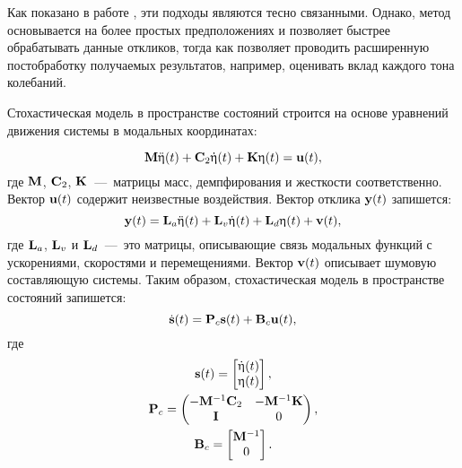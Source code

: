 Как показано в работе \cite{lib:oma:Peeters}, эти подходы являются тесно связанными. Однако, метод  основывается на более простых предположениях и позволяет быстрее обрабатывать данные откликов, тогда как  позволяет проводить расширенную постобработку получаемых результатов, например, оценивать вклад каждого тона колебаний.

Стохастическая модель в пространстве состояний строится на основе уравнений движения системы в модальных координатах:

\begin{equation}
	\mathbf{M} \ddot{\mathbf{\upeta}}(t) + \mathbf{C}_2 \dot{\mathbf{\upeta}}(t) + \mathbf{K} \upeta(t) = \mathbf{u}(t),
\end{equation}
где $ \mathbf{M} $, $ \mathbf{C}_2 $, $ \mathbf{K} $~---~матрицы масс, демпфирования и жесткости соответственно. Вектор $ \mathbf{u}(t) $ содержит неизвестные воздействия. Вектор отклика $ \mathbf{y}(t) $ запишется:
\begin{equation}
	\mathbf{y}(t) = \mathbf{L}_a \ddot{\mathbf{\upeta}}(t) + \mathbf{L}_v \dot{\mathbf{\upeta}}(t) + \mathbf{L}_d \upeta(t) + \mathbf{v}(t),
\end{equation}
где $ \mathbf{L}_a $, $ \mathbf{L}_v $ и $ \mathbf{L}_d $~---~это матрицы, описывающие связь модальных функций с ускорениями, скоростями и перемещениями. Вектор $ \mathbf{v}(t) $ описывает шумовую составляющую системы. Таким образом, стохастическая модель в пространстве состояний запишется:
\begin{equation}
	\dot{\mathbf{s}}(t) = \mathbf{P}_c \mathbf{s}(t) + \mathbf{B}_c \mathbf{u}(t), \label{eq:stochasticModelSSI}
\end{equation}
где 
\begin{gather}
	\mathbf{s}(t) = 
	\begin{bmatrix} 
		\dot{\mathbf{\upeta}}(t) \\ 
		\mathbf{\upeta}(t) 
	\end{bmatrix}, \\
	\mathbf{P}_c =
	\begin{pmatrix}
		-\mathbf{M} ^ {-1} \mathbf{C}_2 & -\mathbf{M} ^ {-1} \mathbf{K} \\
		 \mathbf{I} & 0
	\end{pmatrix}, \\
	\mathbf{B}_c = 
	\begin{bmatrix}
		\mathbf{M} ^ {-1} \\
		0	
	\end{bmatrix}.
\end{gather}

